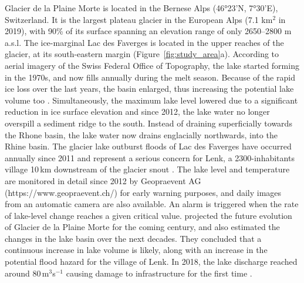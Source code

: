 Glacier de la Plaine Morte is located in the Bernese Alps (46°23'N, 7°30'E), Switzerland. It is the largest plateau glacier in the European Alps (7.1 km$^2$ in 2019), with 90\% of its surface spanning an elevation range of only 2650--2800 m a.s.l. The ice-marginal Lac des Faverges is located in the upper reaches of the glacier, at its south-eastern margin (Figure~\ref{fig:study_area}a). According to aerial imagery of the Swiss Federal Office of Topography, the lake started forming in the 1970s, and now fills annually during the melt season. Because of the rapid ice loss over the last years, the basin enlarged, thus increasing the potential lake volume too \citep{Huss&al2013b}. Simultaneously, the maximum lake level lowered due to a significant reduction in ice surface elevation and since 2012, the lake water no longer overspill a sediment ridge to the south. Instead of draining superficially towards the Rhone basin, the lake water now drains englacially northwards, into the Rhine basin. The glacier lake outburst floods of Lac des Faverges have occurred annually since 2011 \citep{Lindner&al2020} and represent a serious concern for Lenk, a 2300-inhabitants village 10\,km downstream of the glacier snout \citep{HydrologicalYearbookofSwitzerland2019} . The lake level and temperature are monitored in detail since 2012 by Geopraevent AG (https://www.geopraevent.ch/) for early warning purposes, and daily images from an automatic camera are also available. An alarm is triggered when the rate of lake-level change reaches a given critical value. \cite{Huss&al2013b} projected the future evolution of Glacier de la Plaine Morte for the coming century, and also estimated the changes in the lake basin over the next decades. They concluded that a continuous increase in lake volume is likely, along with an increase in the potential flood hazard for the village of Lenk. In 2018, the lake discharge reached around 80\,m$^3$s$^{-1}$ causing damage to infrastructure for the first time \citep{GemeindeLenk2019}.


